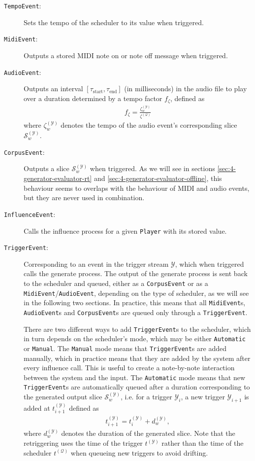 \begin{description}
	\item [\texttt{TempoEvent}:] Sets the tempo of the scheduler to its value when triggered.
	\item [\texttt{MidiEvent}:] Outputs a stored MIDI note on or note off message when triggered.
	\item [\texttt{AudioEvent}:] Outputs an interval $[\tau_\text{start}, \tau_\text{end}]$ (in milliseconds) in the audio file to play over a duration determined by a tempo factor $f_\zeta$, defined as \begin{align}
			f_\zeta = \frac{\zeta^{(\mathcal Y)}_w}{\zeta^{(\mathcal Q)}}
		\end{align}
		where $\zeta^{(\mathcal Y)}_w$ denotes the tempo of the audio event's corresponding slice $\mathcal S^{(\mathcal Y)}_w$.
	\item [\texttt{CorpusEvent}:] Outputs a slice $\mathcal S^{(\mathcal Y)}_w$ when triggered. As we will see in sections \ref{sec:4-generator-evaluator-rt} and \ref{sec:4-generator-evaluator-offline}, this behaviour seems to overlaps with the behaviour of MIDI and audio events, but they are never used in combination.
	\item [\texttt{InfluenceEvent}:] Calls the influence process for a given \texttt{Player} with its stored value.
	\item [\texttt{TriggerEvent}:] Corresponding to an event in the trigger stream $\mathcal Y$, which when triggered calls the generate process. The output of the generate process is sent back to the scheduler and queued, either as a \texttt{CorpusEvent} or as a \texttt{MidiEvent}/\texttt{AudioEvent}, depending on the type of scheduler, as we will see in the following two sections. In practice, this means that all \texttt{MidiEvent}s, \texttt{AudioEvent}s and \texttt{CorpusEvent}s are queued only through a \texttt{TriggerEvent}. 
	
		There are two different ways to add \texttt{TriggerEvent}s to the scheduler, which in turn depends on the scheduler's mode, which may be either \texttt{Automatic} or \texttt{Manual}. The \texttt{Manual} mode means that \texttt{TriggerEvent}s are added manually, which in practice means that they are added by the system after every influence call. This is useful to create a note-by-note interaction between the system and the input. The \texttt{Automatic} mode means that new \texttt{TriggerEvent}s are automatically queued after a duration corresponding to the generated output slice $\mathcal S^{(\mathcal Y)}_w$, i.e. for a trigger $\mathcal Y_i$, a new trigger $\mathcal Y_{i+1}$ is added at $t^{(\mathcal Y)}_{i+1}$ defined as
			\begin{align}
				t^{(\mathcal Y)}_{i+1} = t^{(\mathcal Y)}_i + d^{(\mathcal Y)}_w,
			\end{align}
			where $d^{(\mathcal Y)}_w$ denotes the duration of the generated slice.
			Note that the retriggering uses the time of the trigger $t^{(\mathcal Y)}$ rather than the time of the scheduler $t^{(\mathcal Q)}$ when queueing new triggers to avoid drifting.
\end{description}

